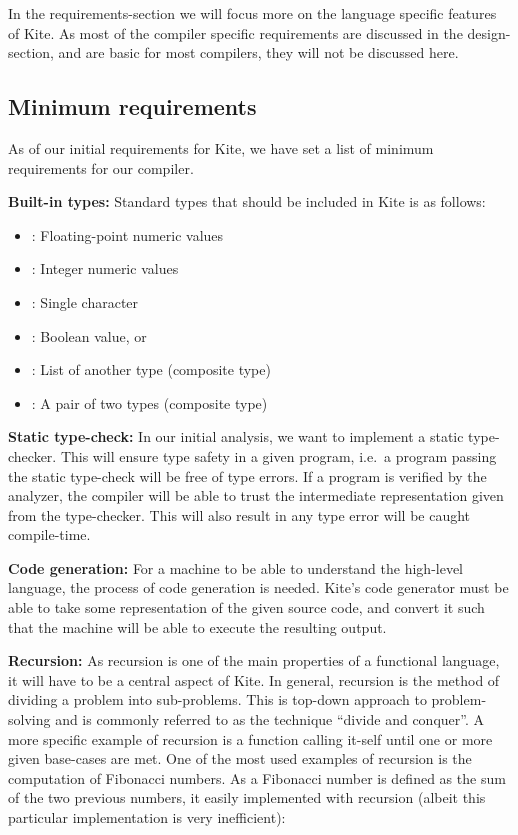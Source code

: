 
In the requirements-section we will focus more on the language specific features of Kite. As most of the compiler specific requirements are discussed in the design-section, and are basic for most compilers, they will not be discussed here.

\subsection{Minimum requirements}
As of our initial requirements for Kite, we have set a list of minimum requirements for our compiler.

\textbf{Built-in types:} Standard types that should be included in Kite is as follows:
\begin{itemize}
\item {}: Floating-point numeric values
\item {}: Integer numeric values
\item {}: Single character
\item {}: Boolean value,  or 
\item {}: List of another type (composite type)
\item {}: A pair of two types (composite type)
\end{itemize}

\textbf{Static type-check:}
In our initial analysis, we want to implement a static type-checker. This will ensure type safety in a given program, i.e.\ a program passing the static type-check will be free of type errors. If a program is verified by the analyzer, the compiler will be able to trust the intermediate representation given from the type-checker. This will also result in any type error will be caught compile-time.

\textbf{Code generation:}
For a machine to be able to understand the high-level language, the process of code generation is needed. Kite's code generator must be able to take some representation of the given source code, and convert it such that the machine will be able to execute the resulting output.

\textbf{Recursion:}
As recursion is one of the main properties of a functional language, it will have to be a central aspect of Kite. In general, recursion is the method of dividing a problem into sub-problems. This is top-down approach to problem-solving and is commonly referred to as the technique ``divide and conquer''. A more specific example of recursion is a function calling it-self until one or more given base-cases are met. One of the most used examples of recursion is the computation of Fibonacci numbers. As a Fibonacci number is defined as the sum of the two previous numbers, it easily implemented with recursion (albeit this particular implementation is very inefficient):

